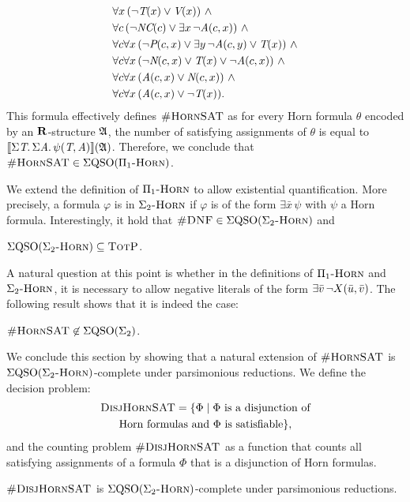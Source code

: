\begin{example}
\begin{align*}
&\forall x \, (\neg \pT(x) \vee \pV(x)) \ \wedge\\
&\forall c \, (\neg \textit{NC}(c) \vee \exists x \, \neg \textit{A}(c,x)) \ \wedge\\
&\forall c \forall x \, (\neg \textit{P}(c,x) \vee \exists y \, \neg \textit{A}(c,y) \vee \textit{T}(x)) \ \wedge\\
&\forall c \forall x \, (\neg \textit{N}(c,x) \vee \textit{T}(x) \vee \neg \textit{A}(c,x)) \ \wedge\\
&\forall c \forall x \, (\textit{A}(c,x) \vee \textit{N}(c,x)) \ \wedge\\
&\forall c \forall x \, (\textit{A}(c,x) \vee \neg\textit{T}(x)).
\end{align*}
This formula effectively defines $\textsc{\#HornSAT}$
as for every Horn formula $\theta$ encoded by an $\mathbf{R}$-structure $\mathfrak{A}$, the number of satisfying assignments of $\theta$ is equal to ${\llbracket{}{\Sigma{\textit{T}}.\, \Sigma{\textit{A}}.\, \psi(\textit{T},\textit{A})}\rrbracket}(\mathfrak{A})$.  Therefore, we conclude that $\textsc{\#HornSAT} \in \Sigma{\rm QSO}(\Pi_1\textsc{-Horn})$. 
\end{example}
We extend the definition of $\Pi_1\textsc{-Horn}$ to allow existential quantification. More precisely, a formula $\varphi$ is in $\Sigma_2\textsc{-Horn}$ if $\varphi$ is of the form $\exists \bar x \, \psi$ with $\psi$ a Horn formula. Interestingly, it hold that $\textsc{\#DNF} \in \Sigma{\rm QSO}(\Sigma_2\textsc{-Horn})$ and

\begin{proposition}\label{prop:ehorn-pe}
$\Sigma{\rm QSO}(\Sigma_2\textsc{-Horn}) \subseteq \text{\sc TotP}$.
\end{proposition}
A natural question at this point is whether in the definitions of $\Pi_1\textsc{-Horn}$ and $\Sigma_2\textsc{-Horn}$, it is necessary to allow negative literals of the form $\exists \bar{v} \, \neg X(\bar{u},\bar{v})$. The following result shows that it is indeed the case:

\begin{proposition}\label{prop:hsat-not-sigma2}	
$\textsc{\#HornSAT} \not\in \Sigma{\rm QSO}(\Sigma_{2})$.
\end{proposition}
We conclude this section by showing that a natural extension of $\textsc{\#HornSAT}$ is $\Sigma{\rm QSO}(\Sigma_2\textsc{-Horn})$-complete under parsimonious reductions. We define the decision problem:
\begin{multline*}
\textsc{DisjHornSAT} = \{\Phi \mid \Phi \text{ is a disjunction of}\\  \text{Horn formulas and $\Phi$ is satisfiable}\},
\end{multline*}
and the counting problem $\textsc{\#DisjHornSAT}$ as a function that counts all satisfying assignments of a formula $\Phi$ that is a disjunction of Horn formulas.

\begin{theorem} \label{sigma2hard}
	$\textsc{\#DisjHornSAT}$ is $\Sigma{\rm QSO}(\Sigma_2\textsc{-Horn})$-complete under parsimonious reductions. 
\end{theorem}